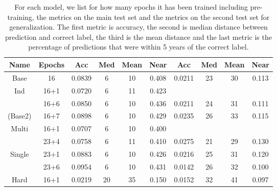 
\begin{table}
  \centering
  \begin{tabular}{|c|c||c|c|c|c||c|c|c|c|}
    \hline
    Name & Epochs & Acc & Med & Mean & Near & Acc & Med & Mean & Near \\
    \hline
    Base & 16 & 0.0839 & 6 & 10 & 0.408 & 0.0211 & 23 & 30 & 0.113 \\
    \hline
    Ind & 16+1 & 0.0720 & 6 & 11 & 0.423 &  &  &  & \\
    & 16+6 & 0.0850 & 6 & 10 & 0.436 & 0.0211 & 24 & 31 & 0.111 \\
    (Base2) & 16+7 & 0.0898 & 6 & 10 & 0.429 & 0.0235 & 26 & 33 & 0.115 \\
    \hline
    Multi & 16+1 & 0.0707 & 6 & 10 & 0.400 &  &  &  & \\
    & 23+4 & 0.0758 & 6 & 11 & 0.410 & 0.0275 & 21 & 29 & 0.130 \\
    \hline
    Single & 23+1 & 0.0883 & 6 & 10 & 0.426 & 0.0216 & 25 & 31 & 0.120 \\
    & 23+6 & 0.0954 & 6 & 10 & 0.431 & 0.0142 & 26 & 32 & 0.100 \\
    \hline
    Hard & 16+1 & 0.0219 & 20 & 35 & 0.150 & 0.0152 & 32 & 41 & 0.097 \\
    \hline
  \end{tabular}
  \caption{For each model, we list for how many epochs it has been trained including pre-training, the metrics on the main test set and the metrics on the second test set for generalization.
  The first metric is accuracy, the second is median distance between prediction and correct label, the third is the mean distance and the last metric is the percentage of predictions that were within 5 years of the correct label.
  }
  \label{tab:model_overview}
\end{table}
